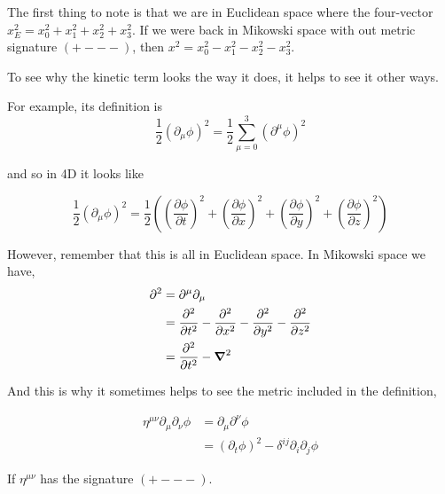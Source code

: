 The first thing to note is that we are in Euclidean space where the four-vector
$x_{E}^{2} = x_{0}^{2} + x_{1}^{2} + x_{2}^{2} + x_{3}^{2}$.
If we were back in Mikowski space with out metric signature $(+ - - -)$,
then $x^{2} = x_{0}^{2} - x_{1}^{2} - x_{2}^{2} - x_{3}^{2}$.

To see why the kinetic term looks the way it does, it helps to see it other ways.

For example, its definition is
$$
\frac{1}{2} (\partial_{\mu} \phi)^2 = \frac{1}{2} \sum_{\mu=0}^{3} (\partial^{\mu} \phi)^2
$$

and so in 4D it looks like

$$
\frac{1}{2} (\partial_{\mu} \phi)^2 =
\frac{1}{2} \left( 
    \left(\frac{\partial \phi}{\partial t}\right)^2 +
    \left(\frac{\partial \phi}{\partial x}\right)^2 +
    \left(\frac{\partial \phi}{\partial y}\right)^2 +
    \left(\frac{\partial \phi}{\partial z}\right)^2
\right)
$$

However, remember that this is all in Euclidean space.
In Mikowski space we have,
\begin{align*}
\partial^2 &= \partial^\mu \partial_\mu \\
&= \frac{\partial^2}{\partial t^2} - \frac{\partial^2}{\partial x^2} - \frac{\partial^2}{\partial y^2} - \frac{\partial^2}{\partial z^2} \\
&= \frac{\partial^2}{\partial t^2} - \boldsymbol{\mathbf{\nabla}}^2
\end{align*}

And this is why it sometimes helps to see the metric included in the definition,

\begin{align*}
\eta^{\mu\nu} \partial_\mu \partial_\nu \phi &= \partial_\mu \partial^\nu \phi \\
&= \left( \partial_t \phi \right)^2 - \delta^{ij} \partial_i \partial_j \phi
\end{align*}

If $\eta^{\mu\nu}$ has the signature $(+ - - -)$.